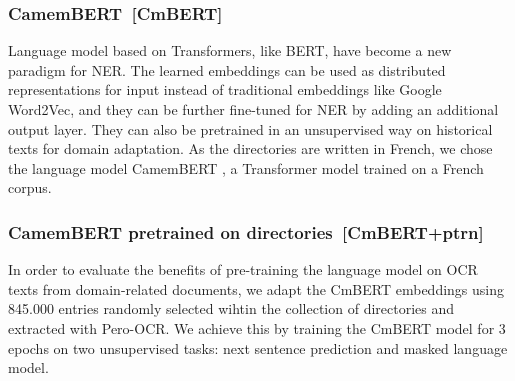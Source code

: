 \subsubsection{CamemBERT~[CmBERT]}
Language model based on Transformers, like BERT, have become a new paradigm for NER\cite{li2020}. 
The learned embeddings can be used as distributed representations for input instead of traditional embeddings like Google Word2Vec, and they can be further fine-tuned for NER by adding an additional output layer. 
They can also be pretrained in an unsupervised way on historical texts for domain adaptation.
As the directories are written in French, we chose the language model CamemBERT \cite{martin-etal-2020-camembert}, a Transformer model trained on a French corpus.
\subsubsection{CamemBERT pretrained on directories~[CmBERT+ptrn]}
In order to evaluate the benefits of pre-training the language model on OCR texts from domain-related documents, we adapt the CmBERT embeddings using \num{845.000} entries randomly selected wihtin the collection of directories and extracted with Pero-OCR.
We achieve this by training the CmBERT model for 3 epochs on two unsupervised tasks: next sentence prediction and masked language model.



